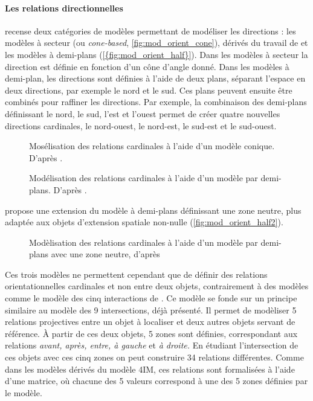 \paragraph{Les relations directionnelles}

\textcite{Frank1992} recense deux catégories de modèles permettant de
modéliser les directions : les modèles à secteur (ou
\emph{cone-based}, \autoref{fig:mod_orient_cone}), dérivés du travail
de \textcite{Peuquet1987} et les modèles à demi-plans
(\autoref{{fig:mod_orient_half}}). Dans les modèles à secteur la
direction est définie en fonction d'un cône d'angle donné. Dans les
modèles à demi-plan, les directions sont définies à l'aide de deux
plans, séparant l'espace en deux directions, par exemple le nord et le
sud. Ces plans peuvent ensuite être combinés pour raffiner les
directions. Par exemple, la combinaison des demi-plans définissant le
nord, le sud, l'est et l'ouest permet de créer quatre nouvelles
directions cardinales, le nord-ouest, le nord-est, le sud-est et le
sud-ouest.

\begin{figure}
  \centering
    
    \caption{Mosélisation des relations cardinales à l'aide d'un
      modèle conique. D'après \textcite{Renz2004}.}
  \label{fig:mod_orient_cone}
\end{figure}

\begin{figure}
  \centering
    
  \caption{Modélisation des relations cardinales à l'aide d'un modèle
    par demi-plans. D'après \textcite{Frank1992}.}
  \label{fig:mod_orient_half}
\end{figure}


\textcite{Frank1992} propose une extension du modèle à demi-plans
définissant une zone neutre, plus adaptée aux objets d'extension
spatiale non-nulle (\autoref{fig:mod_orient_half2}).

\begin{figure}
  \centering
    
  \caption{Modèlisation des relations cardinales à l'aide d'un modèle
    par demi-plans avec une zone neutre, d'après \textcite{Frank1992}}
  \label{fig:mod_orient_half2}
\end{figure}

Ces trois modèles ne permettent cependant que de définir des relations
orientationnelles cardinales et non entre deux objets, contrairement à
des modèles comme le modèle des cinq interactions de
\textcite{Clementini2006}. Ce modèle se fonde sur un principe
similaire au modèle des 9 intersections, déjà présenté. Il permet de
modèliser 5 relations projectives entre un objet à localiser et deux
autres objets servant de référence. À partir de ces deux objets, 5
zones sont définies, correspondant aux relations \emph{avant, après,
  entre, à gauche} et \emph{à droite.} En étudiant l'intersection de
ces objets avec ces cinq zones on peut construire 34 relations
différentes. Comme dans les modèles dérivés du modèle 4IM, ces
relations sont formalisées à l'aide d'une matrice, où chacune des 5
valeurs correspond à une des 5 zones définies par le modèle.


